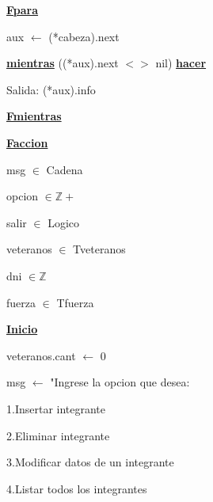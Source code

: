 \documentclass{article}
\begin{document}
            \hspace{12mm}\underline{\textbf{Fpara}}

            \hspace{12mm}aux $\leftarrow$ (*cabeza).next

            \hspace{12mm}\underline{\textbf{mientras}} ((*aux).next $<>$ nil) \underline{\textbf{hacer}}

                \hspace{16mm}Salida: (*aux).info

            \hspace{12mm}\underline{\textbf{Fmientras}}

    \hspace{4mm}\underline{\textbf{Faccion}}

    \vspace{4mm}

    \hspace{4mm}msg $\in$ Cadena

    \hspace{4mm}opcion $\in \mathbb{Z+}$

    \hspace{4mm}salir $\in$ Logico

    \hspace{4mm}veteranos $\in$ Tveteranos

    \hspace{4mm}dni $\in \mathbb{Z}$

    \hspace{4mm}fuerza $\in$ Tfuerza

    \vspace{4mm}

    \underline{\textbf{Inicio}}

    \hspace{4mm}veteranos.cant $\leftarrow$ 0

    \hspace{4mm}msg $\leftarrow$ "Ingrese la opcion que desea: 

        \hspace{17mm}1.Insertar integrante

        \hspace{17mm}2.Eliminar integrante

        \hspace{17mm}3.Modificar datos de un integrante

        \hspace{17mm}4.Listar todos los integrantes
\end{document}
